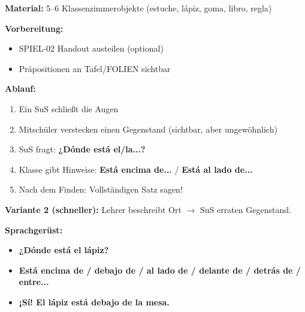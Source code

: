 \documentclass[11pt,a4paper]{article}
\newcommand{\es}[1]{\textbf{#1}}
\begin{document}
\begin{tcolorbox}[colback=white, colframe=spiel, title=\textcolor{white}{\textbf{Spielablauf (15 Min.)}}]

\textbf{Material:} 5--6 Klassenzimmerobjekte (estuche, lápiz, goma, libro, regla)

\vspace{0.3cm}

\textbf{Vorbereitung:}
\begin{itemize}[nosep]
    \item SPIEL-02 Handout austeilen (optional)
    \item Präpositionen an Tafel/FOLIEN sichtbar
\end{itemize}

\vspace{0.3cm}

\textbf{Ablauf:}
\begin{enumerate}[nosep]
    \item Ein SuS schließt die Augen
    \item Mitschüler verstecken einen Gegenstand (sichtbar, aber ungewöhnlich)
    \item SuS fragt: \es{¿Dónde está el/la...?}
    \item Klasse gibt Hinweise: \es{Está encima de...} / \es{Está al lado de...}
    \item Nach dem Finden: Vollständigen Satz sagen!
\end{enumerate}

\vspace{0.3cm}

\textbf{Variante 2 (schneller):} Lehrer beschreibt Ort $\rightarrow$ SuS erraten Gegenstand.

\vspace{0.3cm}

\textbf{Sprachgerüst:}
\begin{itemize}[nosep]
    \item \es{¿Dónde está el lápiz?}
    \item \es{Está encima de / debajo de / al lado de / delante de / detrás de / entre...}
    \item \es{¡Sí! El lápiz está debajo de la mesa.}
\end{itemize}

\end{tcolorbox}

\vspace{0.5cm}

\end{document}
